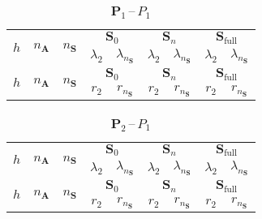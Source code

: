 \documentclass[12pt]{article}
\newcommand{\vect}[1]{\boldsymbol{\mathbf{#1}}}
\begin{document}
\begin{table}[h!]
	\centering
	\caption{$\vect P_1$\,--\,$P_1$} 
	\label{tab:p1p1}
	\small
	\begin{tabular}[1.3]{|c|c|c|c|c|c|c|c|c|}
		\hline
		\multirow{2}{*}{$h$} & \multirow{2}{*}{$n_{\vect A}$} & \multirow{2}{*}{$n_{\vect S}$} & \multicolumn{2}{c|}{$\vect S_0$} & \multicolumn{2}{c|}{$\vect S_n$} & \multicolumn{2}{c|}{$\vect S_{\text{full}}$} \\ 
		\cline{4-9}
		& & & $\lambda_2$ & $\lambda_{n_{\vect S}}$ & $\lambda_2$ & $\lambda_{n_{\vect S}}$ & $\lambda_2$ & $\lambda_{n_{\vect S}}$ \\ 
		\hline
		
		\hline
		\multirow{2}{*}{$h$} & \multirow{2}{*}{$n_{\vect A}$} & \multirow{2}{*}{$n_{\vect S}$} & \multicolumn{2}{c|}{$\vect S_0$} & \multicolumn{2}{c|}{$\vect S_n$} & \multicolumn{2}{c|}{$\vect S_{\text{full}}$} \\ 
		\cline{4-9}
		& & & $r_2$ & $r_{n_{\vect S}}$ & $r_2$ & $r_{n_{\vect S}}$ & $r_2$ & $r_{n_{\vect S}}$ \\ 
		\hline
		
	\end{tabular}
\end{table}

\begin{table}[h!]
	\centering
	\caption{$\vect P_2$\,--\,$P_1$} 
	\label{tab:p2p1}
	\small
	\begin{tabular}[1.3]{|c|c|c|c|c|c|c|c|c|}
		\hline
		\multirow{2}{*}{$h$} & \multirow{2}{*}{$n_{\vect A}$} & \multirow{2}{*}{$n_{\vect S}$} & \multicolumn{2}{c|}{$\vect S_0$} & \multicolumn{2}{c|}{$\vect S_n$} & \multicolumn{2}{c|}{$\vect S_{\text{full}}$} \\ 
		\cline{4-9}
		& & & $\lambda_2$ & $\lambda_{n_{\vect S}}$ & $\lambda_2$ & $\lambda_{n_{\vect S}}$ & $\lambda_2$ & $\lambda_{n_{\vect S}}$ \\ 
		\hline
		
		\hline
		\multirow{2}{*}{$h$} & \multirow{2}{*}{$n_{\vect A}$} & \multirow{2}{*}{$n_{\vect S}$} & \multicolumn{2}{c|}{$\vect S_0$} & \multicolumn{2}{c|}{$\vect S_n$} & \multicolumn{2}{c|}{$\vect S_{\text{full}}$} \\ 
		\cline{4-9}
		& & & $r_2$ & $r_{n_{\vect S}}$ & $r_2$ & $r_{n_{\vect S}}$ & $r_2$ & $r_{n_{\vect S}}$ \\ 
		\hline
		
	\end{tabular}
\end{table}
\end{document}
